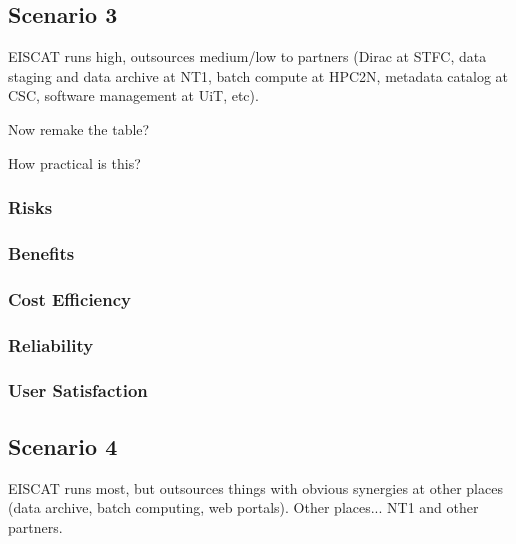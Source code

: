 \documentclass[12pt,a4paper]{article}
\begin{document}

\subsection{Scenario 3}
\label{ssec:scen3}

EISCAT runs high, outsources medium/low to partners (Dirac at STFC, data staging and data archive at NT1, batch compute at HPC2N, metadata catalog at CSC, software management at UiT, etc).

Now remake the table?

How practical is this?



\subsubsection*{Risks}
\bitm
\item 
\eitm

\subsubsection*{Benefits}
\bitm
\item 
\eitm

\subsubsection*{Cost Efficiency}
\bitm
\item 
\eitm

\subsubsection*{Reliability}
\bitm
\item 
\eitm

\subsubsection*{User Satisfaction}
\bitm
\item 
\eitm

\subsection{Scenario 4}
\label{ssec:scen4}

EISCAT runs most, but outsources things with obvious synergies at other places (data archive, batch computing, web portals).
Other places... NT1 and other partners.
\end{document}
